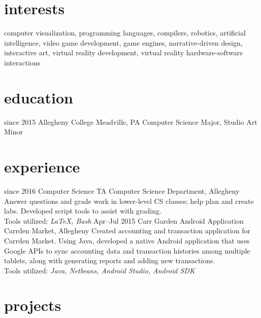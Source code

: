 \documentclass[]{friggeri-cv}
\begin{document}
\section{interests}

computer visualization, programming languages, compilers, robotics, artificial intelligence, video game development, game engines,  narrative-driven design, interactive art, virtual reality development, virtual reality hardware-software interactions

\section{education}

\begin{entrylist}
  \entry
    {since 2015}
    {Allegheny College}
    {Meadville, PA}
    {Computer Science Major, Studio Art Minor}
\end{entrylist}

\section{experience}

\begin{entrylist}
  \entry
    {since 2016}
    {Computer Science TA}
    { Computer Science Department, Allegheny}
    {Answer questions and grade work in lower-level CS classes; help plan and create labs. Developed script tools to assist with grading.\\Tools utilized: \emph{\LaTeX , Bash}}
  \entry
    {Apr--Jul 2015}
    {Carr Garden Android Application}
    { Carrden Market, Allegheny}
    {Created accounting and transaction application for Carrden Market. Using Java, developed a native Android application that uses Google APIs to sync accounting data and transaction histories among multiple tablets, along with generating reports and adding new transactions.\\Tools utilized: \emph{Java, Netbeans, Android Studio, Android SDK}}
\end{entrylist}

\section{projects}
\end{document}
